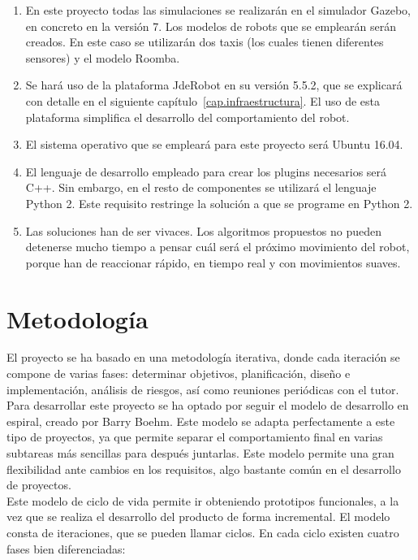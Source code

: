\begin{enumerate}[1.]
\item En este proyecto todas las simulaciones se realizarán en el simulador Gazebo, en concreto en la versión 7. Los modelos de robots que se emplearán serán creados. En este caso se utilizarán dos taxis (los cuales tienen diferentes sensores) y el modelo Roomba.
\item Se hará uso de la plataforma JdeRobot en su versión 5.5.2, que se explicará con detalle en el siguiente capítulo~\ref{cap.infraestructura}. El uso de esta plataforma simplifica el desarrollo del comportamiento del robot. 
\item El sistema operativo que se empleará para este proyecto será Ubuntu 16.04.
\item El lenguaje de desarrollo empleado para crear los plugins necesarios será C++. Sin embargo, en el resto de componentes se utilizará el lenguaje Python 2. Este requisito restringe la solución a que se programe en Python 2.
\item Las soluciones han de ser vivaces. Los algoritmos propuestos no pueden detenerse mucho tiempo a pensar cuál será el próximo movimiento del robot, porque han de reaccionar rápido, en tiempo real y con movimientos suaves.
\end{enumerate}

\section{Metodología}
El proyecto se ha basado en una metodología iterativa, donde cada iteración se compone de varias fases: determinar objetivos, planificación, diseño e implementación, análisis de riesgos, así como reuniones periódicas con el tutor.\\

Para desarrollar este proyecto se ha optado por seguir el modelo de desarrollo en espiral, creado por Barry Boehm. Este modelo se adapta perfectamente a este tipo de proyectos, ya que permite separar el comportamiento final en varias subtareas más sencillas para después juntarlas. Este modelo permite una gran flexibilidad ante cambios en los requisitos, algo bastante común en el desarrollo de proyectos.\\

Este modelo de ciclo de vida permite ir obteniendo prototipos funcionales, a la vez que se realiza el desarrollo del producto de forma incremental. El modelo consta de iteraciones, que se pueden llamar ciclos. En cada ciclo existen cuatro fases bien diferenciadas:

